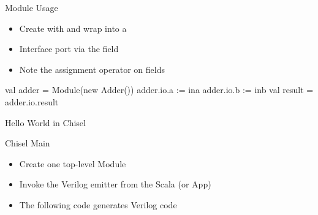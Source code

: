 \begin{frame}[fragile]{Module Usage}
\begin{itemize}
\item Create with  and wrap into a 
\item Interface port via the  field
\item Note the assignment operator \code{:=} on  fields
\end{itemize}
\begin{chisel}
  val adder = Module(new Adder())
  adder.io.a := ina
  adder.io.b := inb
  val result = adder.io.result
\end{chisel}
\end{frame}

%
%
%
%
%

\begin{frame}[fragile]{Hello World in Chisel}
\end{frame}

\begin{frame}[fragile]{Chisel Main}

\begin{itemize}
\item Create one top-level Module
\item Invoke the Verilog emitter from the Scala  (or App)
\item The following code generates Verilog code
\end{itemize}
\end{frame}

